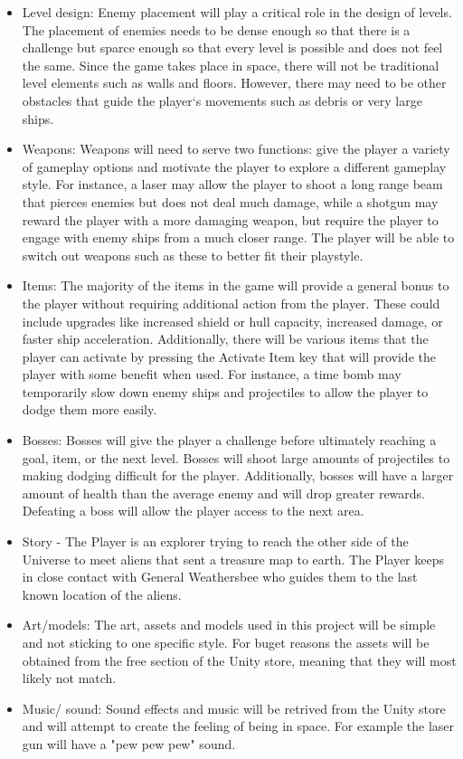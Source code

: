 \documentclass[12pt]{article}       %
\begin{document}
\begin{itemize}
\item Level design: Enemy placement will play a critical role in the design of levels. The placement of enemies needs to be dense enough so that there is a challenge but  sparce enough so that every level is possible and does not feel the same. Since the game takes place in space, there will not be traditional level elements such as walls and floors. However, there may need to be other obstacles that guide the player‘s movements such as debris or very large ships.

\item Weapons: Weapons will need to serve two functions: give the player a variety of gameplay options and motivate the player to explore a different gameplay style. For instance, a laser may allow the player to shoot a long range beam that pierces enemies but does not deal much damage, while a shotgun may reward the player with a more damaging weapon, but require the player to engage with enemy ships from a much closer range. The player will be able to switch out weapons such as these to better fit their playstyle.

\item Items: The majority of the items in the game will provide a general bonus to the player without requiring additional action from the player. These could include upgrades like increased shield or hull capacity, increased damage, or faster ship acceleration. Additionally, there will be various items that the player can activate by pressing the Activate Item key that will provide the player with some benefit when used. For instance, a time bomb may temporarily slow down enemy ships and projectiles to allow the player to dodge them more easily.

\item Bosses: Bosses will give the player a challenge before ultimately reaching a goal, item, or the next level. Bosses will shoot large amounts of projectiles to making dodging difficult for the player. Additionally, bosses will have a larger amount of health than the average enemy and will drop greater rewards. Defeating a boss will allow the player access to the next area.

\item Story - The Player is an explorer trying to reach the other side of the Universe to meet aliens that sent a treasure map to earth. The Player keeps in close contact with General Weathersbee who guides them to the last known location of the aliens. 

\item Art/models: The art, assets and models used in this project will be simple and not sticking to one specific style. For buget reasons the assets will be obtained from the free section of the Unity store, meaning that they will most likely not match. 

\item Music/ sound: Sound effects and music will be retrived from the Unity store and will attempt to create the feeling of being in space. For example the laser gun will have a "pew pew pew" sound. 

\end{itemize}
\end{document}
